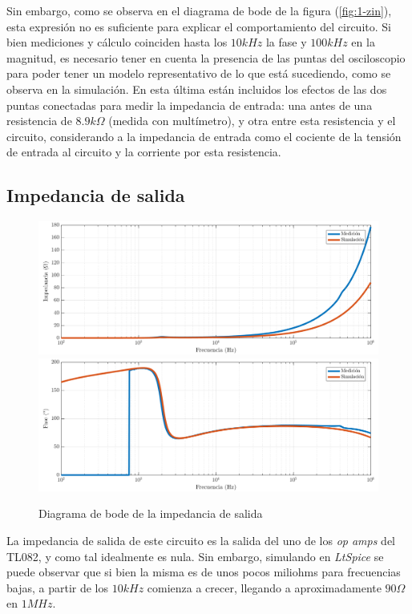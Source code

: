 \documentclass[../../tc_tp3_main.tex]{subfiles}
\begin{document}
Sin embargo, como se observa en el diagrama de bode de la figura (\ref{fig:1-zin}), esta expresi\'on no es suficiente para explicar el comportamiento del circuito. Si bien mediciones y c\'alculo coinciden hasta los $10kHz$ la fase y $100kHz$ en la magnitud, es necesario tener en cuenta la presencia de las puntas del osciloscopio para poder tener un modelo representativo de lo que est\'a sucediendo, como se observa en la simulaci\'on. En esta \'ultima est\'an incluidos los efectos de las dos puntas conectadas para medir la impedancia de entrada: una antes de una resistencia de $8.9k\Omega$ (medida con mult\'imetro), y otra entre esta resistencia y el circuito, considerando a la impedancia de entrada como el cociente de la tensi\'on de entrada al circuito y la corriente por esta resistencia.


\subsection{Impedancia de salida}

\begin{figure}[b]
	\centering
  	\includegraphics[scale = 0.5]{imagenes/tc_tp3_ej1_zout_mag.png}
  	\includegraphics[scale = 0.5]{imagenes/tc_tp3_ej1_zout_fase.png}
  	\caption{Diagrama de bode de la impedancia de salida}
  	\label{fig:1-zout}
\end{figure}

La impedancia de salida de este circuito es la salida del uno de los \textit{op amps} del TL082, y como tal idealmente es nula. Sin embargo, simulando en \textit{LtSpice} se puede observar que si bien la misma es de unos pocos miliohms para frecuencias bajas, a partir de los $10kHz$ comienza a crecer, llegando a aproximadamente $90\Omega$ en $1MHz$. \par
\end{document}
